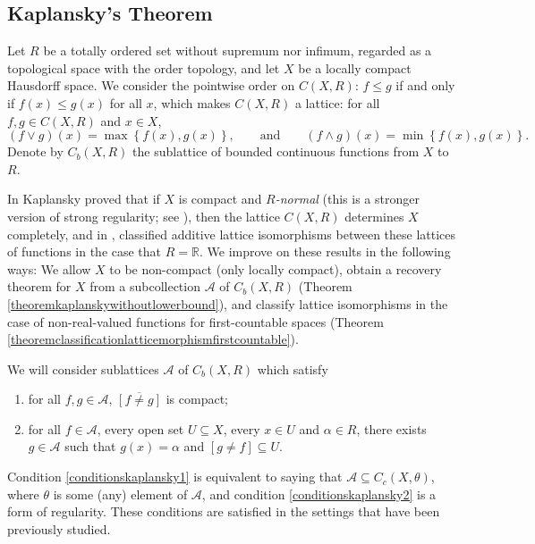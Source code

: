 \documentclass[letter,11pt]{amsart}
\theoremstyle{plain}		\newtheorem{theorem}[generalnumbering]{Theorem}
\theoremstyle{plain}		\newtheorem{corollary}[generalnumbering]{Corollary}
\theoremstyle{definition}		\newtheorem{definition}[generalnumbering]{Definition}
\theoremstyle{definition}		\newtheorem{example}[generalnumbering]{Example}
\theoremstyle{plain}		\newtheorem{proposition}[generalnumbering]{Proposition}
\theoremstyle{plain}		\newtheorem{lemma}[generalnumbering]{Lemma}
\theoremstyle{definition}
\begin{document}
\subsection{Kaplansky's Theorem}\label{subsectionkaplansky}

Let $R$ be a totally ordered set without supremum nor infimum, regarded as a topological space with the order topology, and let $X$ be a locally compact Hausdorff space. We consider the pointwise order on $C(X,R)$: $f\leq g$ if and only if $f(x)\leq g(x)$ for all $x$, which makes $C(X,R)$ a lattice: for all $f,g\in C(X,R)$ and $x\in X$,
\[(f\lor g)(x)=\max\left\{f(x),g(x)\right\},\qquad\text{and}\qquad(f\land g)(x)=\min\left\{f(x),g(x)\right\}.\]
Denote by $C_b(X,R)$ the sublattice of bounded continuous functions from $X$ to $R$.

In \cite{MR0020715} Kaplansky proved that if $X$ is compact and \emph{$R$-normal} (this is a stronger version of strong regularity; see \cite[p.\ 618]{MR0020715}), then the lattice $C(X,R)$ determines $X$ completely, and in \cite{MR0026240}, classified additive lattice isomorphisms between these lattices of functions in the case that $R=\mathbb{R}$. We improve on these results in the following ways: We allow $X$ to be non-compact (only locally compact), obtain a recovery theorem for $X$ from a subcollection $\mathcal{A}$ of $C_b(X,R)$ (Theorem \ref{theoremkaplanskywithoutlowerbound}), and classify lattice isomorphisms in the case of non-real-valued functions for first-countable spaces (Theorem \ref{theoremclassificationlatticemorphismfirstcountable}).

We will consider sublattices $\mathcal{A}$ of $C_b(X,R)$ which satisfy
\begin{enumerate}[label=(L\arabic*)]
	\item\label{conditionskaplansky1} for all $f,g\in\mathcal{A}$, $\overline{[f\neq g]}$ is compact;
	\item\label{conditionskaplansky2} for all $f\in\mathcal{A}$, every open set $U\subseteq X$, every $x\in U$ and $\alpha\in R$, there exists $g\in\mathcal{A}$ such that $g(x)=\alpha$ and $[g\neq f]\subseteq U$.
\end{enumerate}

Condition \ref{conditionskaplansky1} is equivalent to saying that $\mathcal{A}\subseteq C_c(X,\theta)$, where $\theta$ is some (any) element of $\mathcal{A}$, and condition \ref{conditionskaplansky2} is a form of regularity. These conditions are satisfied in the settings that have been previously studied.
\end{document}
